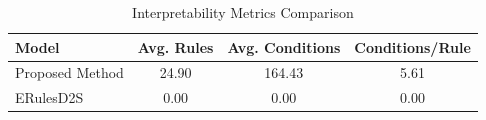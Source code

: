 \begin{table}[htbp]
\centering
\caption{Interpretability Metrics Comparison}
\label{tab:complexity}
\begin{tabular}{lccc}
\toprule
Model & Avg. Rules & Avg. Conditions & Conditions/Rule \\
\midrule
Proposed Method & 24.90 & 164.43 & 5.61 \\
ERulesD2S & 0.00 & 0.00 & 0.00 \\
\bottomrule
\end{tabular}
\end{table}